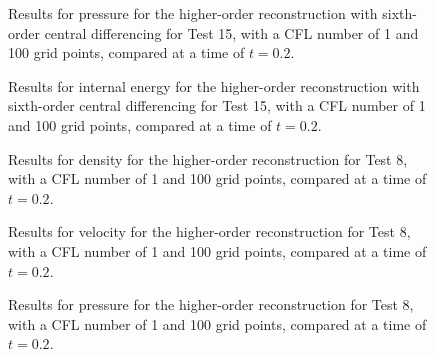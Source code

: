 \begin{figure}
	\caption[Results for pressure for the higher-order reconstruction with sixth-order central differencing for Test 15, with a CFL number of 1 and 100 grid points, compared at a time of $t=0.2$.]{Results for pressure for the higher-order reconstruction with sixth-order central differencing for Test 15, with a CFL number of 1 and 100 grid points, compared at a time of $t=0.2$.}
	\label{fig:Test15HORCD6pressure}
\end{figure}

\begin{figure}
	\caption[Results for internal energy for the higher-order reconstruction with sixth-order central differencing for Test 15, with a CFL number of 1 and 100 grid points, compared at a time of $t=0.2$.]{Results for internal energy for the higher-order reconstruction with sixth-order central differencing for Test 15, with a CFL number of 1 and 100 grid points, compared at a time of $t=0.2$.}
	\label{fig:Test15HORCD6energy}
\end{figure}

\begin{figure}
	\caption[Results for density for the higher-order reconstruction for Test 8, with a CFL number of 1 and 100 grid points, compared at a time of $t=0.2$.]{Results for density for the higher-order reconstruction for Test 8, with a CFL number of 1 and 100 grid points, compared at a time of $t=0.2$.}
	\label{fig:Test8HORdensity}
\end{figure}

\begin{figure}
	\caption[Results for velocity for the higher-order reconstruction for Test 8, with a CFL number of 1 and 100 grid points, compared at a time of $t=0.2$.]{Results for velocity for the higher-order reconstruction for Test 8, with a CFL number of 1 and 100 grid points, compared at a time of $t=0.2$.}
	\label{fig:Test8HORvelocity}
\end{figure}

\begin{figure}
	\caption[Results for pressure for the higher-order reconstruction for Test 8, with a CFL number of 1 and 100 grid points, compared at a time of $t=0.2$.]{Results for pressure for the higher-order reconstruction for Test 8, with a CFL number of 1 and 100 grid points, compared at a time of $t=0.2$.}
	\label{fig:Test8HORpressure}
\end{figure}

